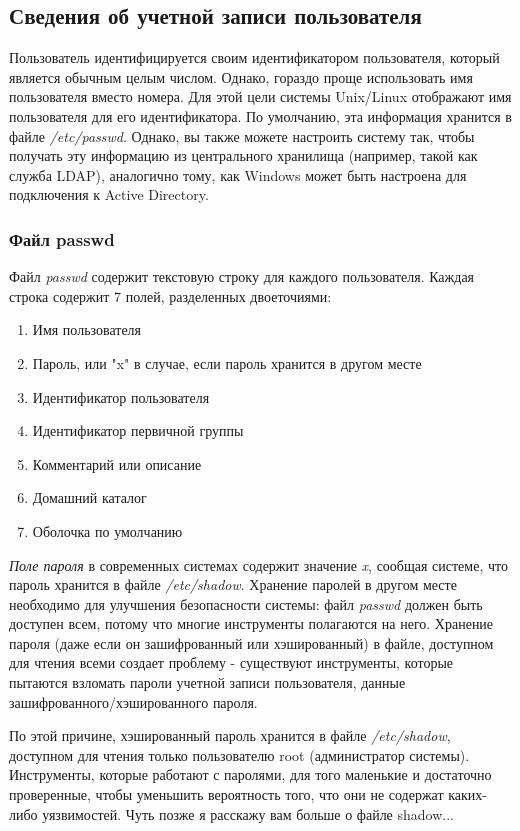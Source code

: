 \documentclass[10pt]{book}
\begin{document}
\subsection{Сведения об учетной записи пользователя}

Пользователь идентифицируется своим идентификатором пользователя, который является обычным целым числом. Однако, гораздо проще использовать имя пользователя вместо номера. Для этой цели системы Unix/Linux отображают имя пользователя для его идентификатора. По умолчанию, эта информация хранится в файле \textit{/etc/passwd}. Однако, вы также можете настроить систему так, чтобы получать эту информацию из центрального хранилища (например, такой как служба LDAP), аналогично тому, как Windows может быть настроена для подключения к Active Directory.
\subsubsection{Файл passwd}

Файл \textit{passwd} содержит текстовую строку для каждого пользователя. Каждая строка содержит 7 полей, разделенных двоеточиями:
\begin{enumerate}
\item Имя пользователя
\item Пароль, или "x" в случае, если пароль хранится в другом месте
\item Идентификатор пользователя
\item Идентификатор первичной группы
\item Комментарий или описание
\item Домашний каталог
\item Оболочка по умолчанию
\end{enumerate}

\textit{Поле пароля} в современных системах содержит значение \textit{x}, сообщая системе, что пароль хранится в файле \textit{/etc/shadow}. Хранение паролей в другом месте необходимо для улучшения безопасности системы: файл \textit{passwd} должен быть доступен всем, потому что многие инструменты полагаются на него. Хранение пароля (даже если он зашифрованный или хэшированный) в файле, доступном для чтения всеми создает проблему - существуют инструменты, которые пытаются взломать пароли учетной записи пользователя, данные зашифрованного/хэшированного пароля. 

По этой причине, хэшированный пароль хранится в файле \textit{/etc/shadow}, доступном для чтения только пользователю root (администратор системы). Инструменты, которые работают с паролями, для того маленькие и достаточно проверенные, чтобы уменьшить вероятность того, что они не содержат каких-либо уязвимостей. Чуть позже я расскажу вам больше о файле shadow... 
\end{document}
